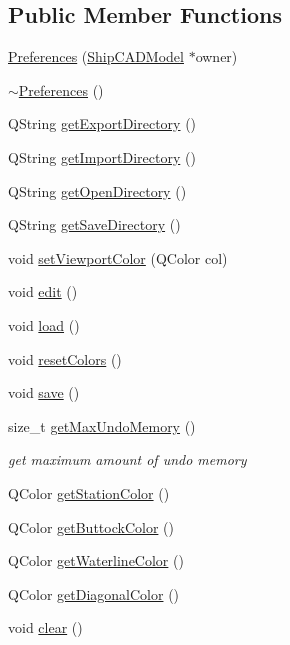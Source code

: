 \subsection*{Public Member Functions}
\begin{DoxyCompactItemize}
\item 
\hyperlink{classShipCAD_1_1Preferences_a42c4f0ca1f224941059ab63064e97643}{Preferences} (\hyperlink{classShipCAD_1_1ShipCADModel}{Ship\-C\-A\-D\-Model} $\ast$owner)
\item 
\hyperlink{classShipCAD_1_1Preferences_ab38e15f8965b1cd69b80369bb16a0995}{$\sim$\-Preferences} ()
\item 
Q\-String \hyperlink{classShipCAD_1_1Preferences_a364d0a7ee05937265ce16f788209d3b2}{get\-Export\-Directory} ()
\item 
Q\-String \hyperlink{classShipCAD_1_1Preferences_ae13135dc55b70c1eb897ef7fc9b2141e}{get\-Import\-Directory} ()
\item 
Q\-String \hyperlink{classShipCAD_1_1Preferences_acffe4077f56c31be66bad278b4d4a2ad}{get\-Open\-Directory} ()
\item 
Q\-String \hyperlink{classShipCAD_1_1Preferences_adcf851de96cfb795773711e1b81ed859}{get\-Save\-Directory} ()
\item 
void \hyperlink{classShipCAD_1_1Preferences_ad120b46e68a08d7682aaeb351b4c179d}{set\-Viewport\-Color} (Q\-Color col)
\item 
void \hyperlink{classShipCAD_1_1Preferences_a326180a1551596a3a9f2709d31c9fb10}{edit} ()
\item 
void \hyperlink{classShipCAD_1_1Preferences_a70c1b8f3b9e117d67c3cd50c33f66f3a}{load} ()
\item 
void \hyperlink{classShipCAD_1_1Preferences_a819790ae129967fedd2fdef27e58fac0}{reset\-Colors} ()
\item 
void \hyperlink{classShipCAD_1_1Preferences_ab3f40207c39fe262a7ae16ca22b297b2}{save} ()
\item 
size\-\_\-t \hyperlink{classShipCAD_1_1Preferences_a0515b279b2bf1bbebeb902544d2b15fd}{get\-Max\-Undo\-Memory} ()
\begin{DoxyCompactList}\small\item\em get maximum amount of undo memory \end{DoxyCompactList}\item 
Q\-Color \hyperlink{classShipCAD_1_1Preferences_af4788e1a2fb21981e1c828f918a6aa64}{get\-Station\-Color} ()
\item 
Q\-Color \hyperlink{classShipCAD_1_1Preferences_a4250fdc214a6f7fd4e694a8d7ce2a64a}{get\-Buttock\-Color} ()
\item 
Q\-Color \hyperlink{classShipCAD_1_1Preferences_a9d02feb9d74677ef2fabc718ae22c05d}{get\-Waterline\-Color} ()
\item 
Q\-Color \hyperlink{classShipCAD_1_1Preferences_aca988ba7652207d09eadbdc805b16c0f}{get\-Diagonal\-Color} ()
\item 
void \hyperlink{classShipCAD_1_1Preferences_ad7a470973484fc81e15f28c98c22074d}{clear} ()
\end{DoxyCompactItemize}
